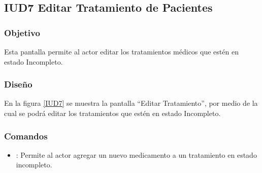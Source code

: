 \subsection{IUD7 Editar Tratamiento de Pacientes}
 
\subsubsection{Objetivo}

    Esta pantalla permite al actor editar los tratamientos médicos que estén en estado Incompleto.

\subsubsection{Diseño}

    En la figura \ref{IUD7} se muestra la pantalla ``Editar Tratamiento'', por medio de la cual se podrá editar los tratamientos que estén en estado Incompleto. \\


\subsubsection{Comandos}
\begin{itemize}
    \item {}: Permite al actor agregar un nuevo medicamento a un tratamiento en estado incompleto.
    
\end{itemize}

%
